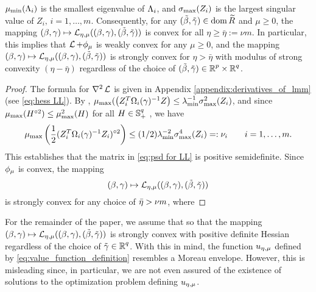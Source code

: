 \begin{lemma}
\[\]
$\mu_{\text{min}}(\Lambda_i)$ is the smallest eigenvalue of $\Lambda_i$, and
 $\sigma_{\text{max}}(Z_i)$ is the largest singular value of $Z_i,\, i=1,\dots,m$.
Consequently, for any $(\tilde\beta,{\tilde{\gamma}})\in\operatorname{\mathrm{dom}}{{\widetilde R}}$ and $\mu\ge 0$, the mapping 
\(
(\beta,\gamma)\mapsto \operatorname{\mathcal{L}}_{{\eta,\mu}}((\beta,\gamma), (\tilde\beta,{\tilde{\gamma}}))
\)
is convex for all $\eta\ge\bar\eta:=\nu m$.
In particular, this implies that $\operatorname{\mathcal{L}}+\phi_\mu$ is weakly convex for any $\mu\ge 0$, 
and the mapping
\(
(\beta,\gamma)\mapsto\operatorname{\mathcal{L}}_{{\eta,\mu}}((\beta,\gamma),(\tilde\beta,{\tilde{\gamma}}))
\)
is strongly convex for $\eta> \bar\eta$ with modulus of strong convexity $(\eta-\bar\eta)$
regardless of the choice of $(\tilde\beta,{\tilde{\gamma}})\in{\operatorname{\mathbb{R}}^p}\times{\operatorname{\mathbb{R}}^q}$.
\end{lemma}
\begin{proof}
The formula for $\nabla^2\operatorname{\mathcal{L}}$ is given in Appendix \ref{appendix:derivatives_of_lmm}
(see \eqref{eq:hess LL}).
By \cite[Theorem 3.1]{ABBP2021}, 
$\mu_{\text{max}}(\left(Z_i^T\Omega_i(\gamma)^{-1}Z\right)\le
\lambda_{\text{min}}^{-1}\sigma_{\text{max}}^2(Z_i)$, and since 
$\mu_{\text{max}}(H^{\circ 2})\le \mu_{\text{max}}^2(H)$
for all $H\in\operatorname{\mathbb{S}}^q_+$ \cite{HJ85}, we have
\[
\mu_{\text{max}}\left(\frac{1}{2}(Z_i^T\Omega_i(\gamma)^{-1}Z_i)^{\circ2}\right)
\le (1/2) \lambda_{\text{min}}^{-2}
\sigma^4_{\text{max}}(Z_i)=:\nu_i
\qquad  i=1,\dots,m.
\]
This establishes that the matrix in \eqref{eq:psd for LL} is positive semidefinite.
Since $\phi_\mu$ is convex, the mapping
\[
(\beta,\gam)\mapsto \LL_{\emu}(\bg,\tbg) %
\]
is strongly convex for any choice
of ${\bar\eta}> \nu m$, where 
\end{proof}
For the remainder of the paper, we assume that 
so that the mapping
$(\beta,\gamma)\mapsto \operatorname{\mathcal{L}}_{{\eta,\mu}}((\beta,\gamma),(\tilde\beta,{\tilde{\gamma}}))$ %
is strongly convex with 
positive definite Hessian
regardless of the 
choice of ${\tilde{\gamma}}\in\operatorname{\mathbb{R}}^q$. With this in mind, the function ${u_{\eta,\mu}}$ defined by
\eqref{eq:value_function_definition} resembles a Moreau envelope.
However, this is misleading since, in particular,
we are not even assured of the existence of solutions to
the optimization problem defining ${u_{\eta,\mu}}$. 

